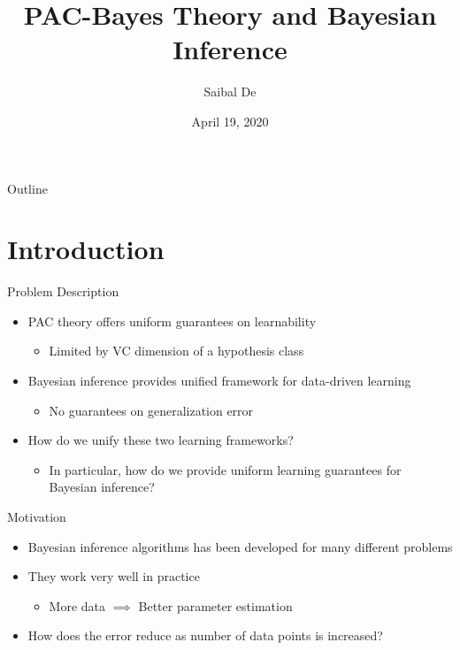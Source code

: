 \documentclass[aspectratio=169]{beamer}
\title{PAC-Bayes Theory and Bayesian Inference}
\author{Saibal De}
\date{April 19, 2020}
\begin{document}
\begin{frame}
  \titlepage
\end{frame}

\begin{frame}{Outline}
  \tableofcontents
\end{frame}

\section{Introduction}

\begin{frame}{Problem Description}
  \begin{itemize}
  	\item
      PAC theory offers uniform guarantees on learnability
      \begin{itemize}
        \item
          Limited by VC dimension of a hypothesis class
      \end{itemize}
  	\item
      Bayesian inference provides unified framework for data-driven learning
      \begin{itemize}
        \item
          No guarantees on generalization error
      \end{itemize}
  	\item
      How do we unify these two learning frameworks?
      \begin{itemize}
        \item
          In particular, how do we provide uniform learning guarantees for
          Bayesian inference?
      \end{itemize}
  \end{itemize}
\end{frame}

\begin{frame}{Motivation}
  \begin{itemize}
    \item
      Bayesian inference algorithms has been developed for many different
      problems
    \item
      They work very well in practice
      \begin{itemize}
        \item
          More data $\implies$ Better parameter estimation
      \end{itemize}
    \item
      How does the error reduce as number of data points is increased?
  \end{itemize}
\end{frame}
\end{document}

